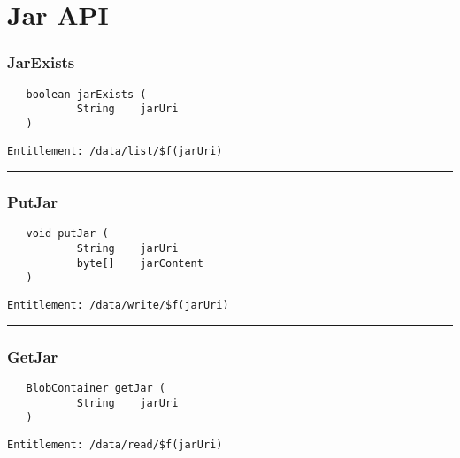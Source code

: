 \chapter{Jar API}

\subsection{JarExists}
\label{Api:JarExists}
\begin{Verbatim}
   boolean jarExists (
           String    jarUri
   )
\end{Verbatim}
\begin{Verbatim}[formatcom=\color{Maroon}]
  Entitlement: /data/list/$f(jarUri)
\end{Verbatim}



\rule{12cm}{2pt}
\subsection{PutJar}
\label{Api:PutJar}
\begin{Verbatim}
   void putJar (
           String    jarUri
           byte[]    jarContent
   )
\end{Verbatim}
\begin{Verbatim}[formatcom=\color{Maroon}]
  Entitlement: /data/write/$f(jarUri)
\end{Verbatim}



\rule{12cm}{2pt}
\subsection{GetJar}
\label{Api:GetJar}
\begin{Verbatim}
   BlobContainer getJar (
           String    jarUri
   )
\end{Verbatim}
\begin{Verbatim}[formatcom=\color{Maroon}]
  Entitlement: /data/read/$f(jarUri)
\end{Verbatim}



